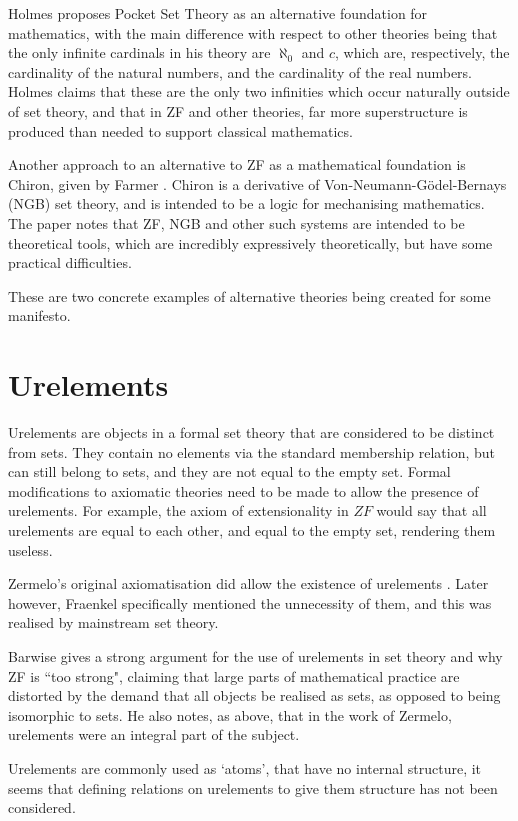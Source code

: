 \documentclass[11pt]{report}
\theoremstyle{definition}
\theoremstyle{theorem}
\theoremstyle{lemma}
\begin{document}
Holmes proposes Pocket Set Theory \cite{pocket} as an alternative foundation for mathematics, with the main difference with respect to other theories being that the only infinite cardinals in his theory are $\aleph_0$ and $c$, which are, respectively, the cardinality of the natural numbers, and the cardinality of the real numbers.
Holmes claims that these are the only two infinities which occur naturally outside of set theory, and that in ZF and other theories, far more superstructure is produced than needed to support classical mathematics.

Another approach to an alternative to ZF as a mathematical foundation is Chiron, given by Farmer \cite{chiron}. Chiron is a derivative of Von-Neumann-G\"odel-Bernays (NGB) set theory, and is intended to be a logic for mechanising mathematics. The paper notes that ZF, NGB and other such systems are intended to be theoretical tools, which are incredibly expressively theoretically, but have some practical difficulties.

These are two concrete examples of alternative theories being created for some manifesto.

\section{Urelements}
Urelements are objects in a formal set theory that are considered to be distinct from sets.
They contain no elements via the standard membership relation, but can still belong to sets, and they are not equal to the empty set. 
Formal modifications to axiomatic theories need to be made to allow the presence of urelements.
For example, the axiom of extensionality in $\mathit{ZF}$ would say that all urelements are equal to each other, and equal to the empty set, rendering them useless. 

Zermelo's original axiomatisation did allow the existence of urelements \cite{zermelo}.
Later however, Fraenkel specifically mentioned the unnecessity of them, and this was realised by mainstream set theory.

Barwise \cite{barwise} gives a strong argument for the use of urelements in set theory and why ZF is ``too strong", claiming that large parts of mathematical practice are distorted by the demand that all objects be realised as sets, as opposed to being isomorphic to sets.
He also notes, as above, that in the work of Zermelo, urelements were an integral part of the subject.

Urelements are commonly used as `atoms', that have no internal structure, it seems that defining relations on urelements to give them structure has not been considered.
\end{document}
